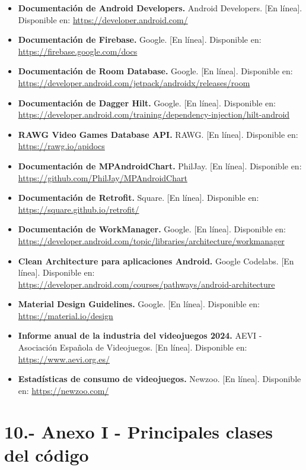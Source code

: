 \documentclass[
  spanish,
  11pt,
  paper=a4,
  ,captions=tableheading
]{scrartcl}
\providecommand{\tightlist}{%
  \setlength{\itemsep}{0pt}\setlength{\parskip}{0pt}}
\begin{document}
\begin{itemize}
\tightlist
\item
  \textbf{Documentación de Android Developers.} Android Developers.
  {[}En línea{]}. Disponible en: \url{https://developer.android.com/}
\item
  \textbf{Documentación de Firebase.} Google. {[}En línea{]}. Disponible
  en: \url{https://firebase.google.com/docs}
\item
  \textbf{Documentación de Room Database.} Google. {[}En línea{]}.
  Disponible en:
  \url{https://developer.android.com/jetpack/androidx/releases/room}
\item
  \textbf{Documentación de Dagger Hilt.} Google. {[}En línea{]}.
  Disponible en:
  \url{https://developer.android.com/training/dependency-injection/hilt-android}
\item
  \textbf{RAWG Video Games Database API.} RAWG. {[}En línea{]}.
  Disponible en: \url{https://rawg.io/apidocs}
\item
  \textbf{Documentación de MPAndroidChart.} PhilJay. {[}En línea{]}.
  Disponible en: \url{https://github.com/PhilJay/MPAndroidChart}
\item
  \textbf{Documentación de Retrofit.} Square. {[}En línea{]}. Disponible
  en: \url{https://square.github.io/retrofit/}
\item
  \textbf{Documentación de WorkManager.} Google. {[}En línea{]}.
  Disponible en:
  \url{https://developer.android.com/topic/libraries/architecture/workmanager}
\item
  \textbf{Clean Architecture para aplicaciones Android.} Google
  Codelabs. {[}En línea{]}. Disponible en:
  \url{https://developer.android.com/courses/pathways/android-architecture}
\item
  \textbf{Material Design Guidelines.} Google. {[}En línea{]}.
  Disponible en: \url{https://material.io/design}
\item
  \textbf{Informe anual de la industria del videojuegos 2024.} AEVI -
  Asociación Española de Videojuegos. {[}En línea{]}. Disponible en:
  \url{https://www.aevi.org.es/}
\item
  \textbf{Estadísticas de consumo de videojuegos.} Newzoo. {[}En
  línea{]}. Disponible en: \url{https://newzoo.com/}
\end{itemize}

\newpage

\hypertarget{anexo-i---principales-clases-del-cuxf3digo}{%
\section{10.- Anexo I - Principales clases del
código}\label{anexo-i---principales-clases-del-cuxf3digo}}
\end{document}
